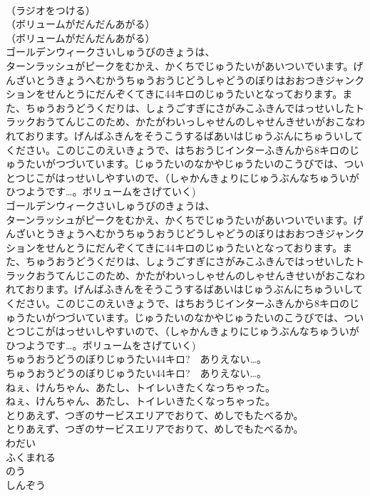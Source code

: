 \documentclass[8pt]{extreport}
\begin{document}
\begin{CJK}{UTF8}{min}
\\	（ラジオをつける）
\\	（ボリュームがだんだんあがる）
\\	（ボリュームがだんだんあがる）
\\	ゴールデンウィークさいしゅうびのきょうは、
\\	ターンラッシュがピークをむかえ、かくちでじゅうたいがあいついでいます。げんざいとうきょうへむかうちゅうおうじどうしゃどうのぼりはおおつきジャンクションをせんとうにだんぞくてきに44キロのじゅうたいとなっております。また、ちゅうおうどうくだりは、しょうごすぎにさがみこふきんではっせいしたトラックおうてんじこのため、かたがわいっしゃせんのしゃせんきせいがおこなわれております。げんばふきんをそうこうするばあいはじゅうぶんにちゅういしてください。このじこのえいきょうで、はちおうじインターふきんから8キロのじゅうたいがつづいています。じゅうたいのなかやじゅうたいのこうびでは、ついとつじこがはっせいしやすいので、（しゃかんきょりにじゅうぶんなちゅういがひつようです…。ボリュームをさげていく)
\\	ゴールデンウィークさいしゅうびのきょうは、
\\	ターンラッシュがピークをむかえ、かくちでじゅうたいがあいついでいます。げんざいとうきょうへむかうちゅうおうじどうしゃどうのぼりはおおつきジャンクションをせんとうにだんぞくてきに44キロのじゅうたいとなっております。また、ちゅうおうどうくだりは、しょうごすぎにさがみこふきんではっせいしたトラックおうてんじこのため、かたがわいっしゃせんのしゃせんきせいがおこなわれております。げんばふきんをそうこうするばあいはじゅうぶんにちゅういしてください。このじこのえいきょうで、はちおうじインターふきんから8キロのじゅうたいがつづいています。じゅうたいのなかやじゅうたいのこうびでは、ついとつじこがはっせいしやすいので、（しゃかんきょりにじゅうぶんなちゅういがひつようです…。ボリュームをさげていく)
\\	ちゅうおうどうのぼりじゅうたい44キロ?　ありえない…。
\\	ちゅうおうどうのぼりじゅうたい44キロ?　ありえない…。
\\	ねぇ、けんちゃん、あたし、トイレいきたくなっちゃった。
\\	ねぇ、けんちゃん、あたし、トイレいきたくなっちゃった。
\\	とりあえず、つぎのサービスエリアでおりて、めしでもたべるか。
\\	とりあえず、つぎのサービスエリアでおりて、めしでもたべるか。
\\	わだい
\\	ふくまれる
\\	のう
\\	しんぞう

\end{CJK}
\end{document}
